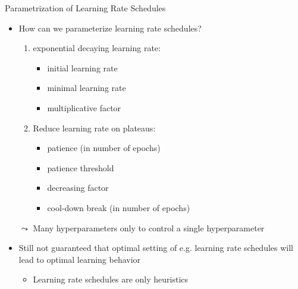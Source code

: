 \begin{frame}[c]{Parametrization of Learning Rate Schedules}
	
	\begin{itemize}
		\item How can we parameterize learning rate schedules?
		\begin{enumerate}
			\item exponential decaying learning rate:
			\begin{itemize}
				\item initial learning rate
				\item minimal learning rate
				\item multiplicative factor
			\end{itemize}
			\pause
			\item Reduce learning rate on plateaus:
			\begin{itemize}
				\item patience (in number of epochs)
				\item patience threshold
				\item decreasing factor
				\item cool-down break (in number of epochs)
			\end{itemize}
		\end{enumerate}
		\pause
		\medskip
		\item[$\leadsto$] Many hyperparameters only to control a single hyperparameter
		\pause   
		\item Still not guaranteed that optimal setting of e.g. learning rate schedules will lead to optimal learning behavior
		\begin{itemize}
			\item Learning rate schedules are only heuristics
		\end{itemize}
	\end{itemize}
	
\end{frame}
